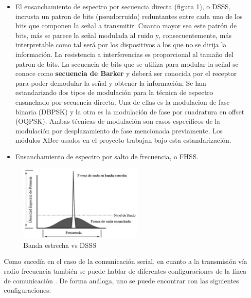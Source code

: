 \begin{itemize}
\item El ensanchamiento de espectro por secuencia directa (figura \ref{fig:DSSS}), o DSSS, incrusta un patron de bits (pseudorruido) reduntantes entre cada uno de los bits que componen la señal a transmitir. Cuanto mayor sea este patrón de bits, más se parece la señal modulada al ruido y, consecuentemente, más interpretable como tal será por los dispositivos a los que no se dirija la información. La resistencia a interferencias es proporcional al tamaño del patron de bits.
La secuencia de bits que se utiliza para modular la señal se conoce como \textbf{secuencia de Barker} y deberá ser conocida por el receptor para poder demodular la señal y obtener la información.
Se han estandarizado dos tipos de modulación para la técnica de espectro ensanchado por secuencia directa. Una de ellas es la modulacion de fase binaria (DBPSK) y  la otra es la modulación de fase por cuadratura en offset (OQPSK). Ambas técnicas de modulación son casos específicos de la modulación por desplazamiento de fase mencionada previamente. Los módulos XBee usados en el proyecto trabajan bajo esta estandarización.
\item Ensanchamiento de espectro por salto de frecuencia, o FHSS.
\end{itemize}

\begin{figure}[tb]
\centering
\includegraphics[width=0.55\textwidth]{figuras/DSSS.png}
\caption{Banda estrecha vs DSSS}
\label{fig:DSSS}
\end{figure}

Como sucedía en el caso de la comunicación serial, en cuanto a la transmisión vía radio frecuencia también se puede hablar de diferentes configuraciones de la línea de comunicación \cite{US_SRM:2008}. De forma análoga, uno se puede encontrar con las siguientes configuraciones:

